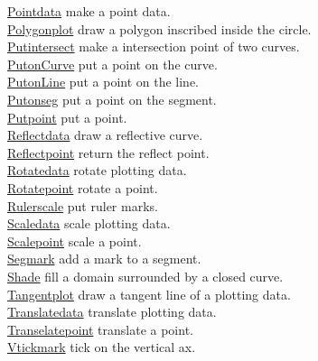 \documentclass[papersize,a4paper,12pt]{article}
\begin{document}
\begin{tabbing}
\hyperlink{pointdata}{Pointdata} \> make a point data.\\
\hyperlink{polygonplot}{Polygonplot} \> draw a polygon inscribed inside the circle.\\
\hyperlink{putintersect}{Putintersect} \> make a intersection point of two curves.\\
\hyperlink{putoncurve}{PutonCurve} \> put a point on the curve.\\
\hyperlink{putonline}{PutonLine} \> put a point on the line.\\
\hyperlink{putonSeg}{Putonseg} \> put a point on the segment.\\
\hyperlink{putpoint}{Putpoint} \> put a point.\\
\hyperlink{reflectdata}{Reflectdata} \> draw a reflective curve.\\
\hyperlink{reflectpoint}{Reflectpoint} \> return the reflect point.\\
\hyperlink{rotatedata}{Rotatedata} \> rotate plotting data.\\
\hyperlink{rotatepoint}{Rotatepoint} \> rotate a point.\\
\hyperlink{rulerscale}{Rulerscale} \> put ruler marks.\\
\hyperlink{scaledata}{Scaledata} \> scale plotting data.\\
\hyperlink{scalepoint}{Scalepoint} \> scale a point.\\
\hyperlink{segmark}{Segmark} \> add a mark to a segment.\\
\hyperlink{shade}{Shade} \> fill a domain surrounded by a closed curve.\\
\hyperlink{tangentplot}{Tangentplot} \> draw a tangent line of a plotting data.\\
\hyperlink{translatedata}{Translatedata} \> translate plotting data.\\
\hyperlink{translatepoint}{Transelatepoint} \> translate a point.\\
\hyperlink{vtickmark}{Vtickmark} \> tick on the vertical ax.\\


\end{tabbing}
\end{document}
